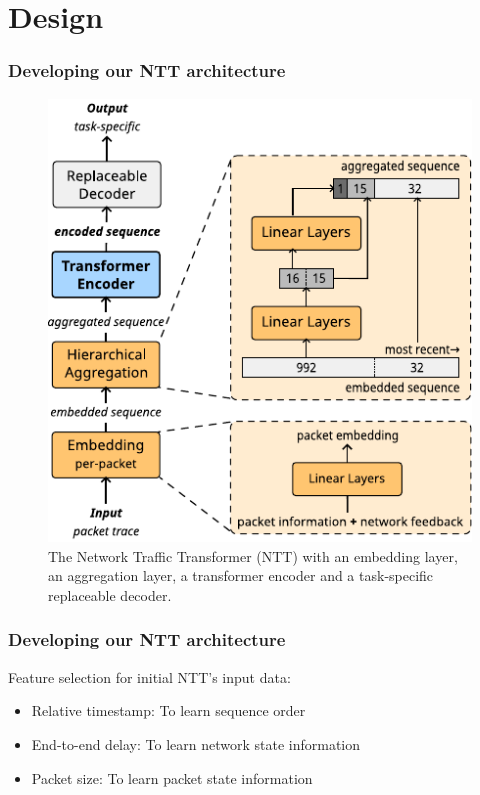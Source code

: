 \documentclass{beamer}
\begin{document}

\section{Design}


\begin{frame}
\frametitle{Developing our NTT architecture}
\pause

\begin{figure}[!hbt]
  \begin{center}
    \includegraphics[scale=0.8]{figures/architecture_ntt.pdf}
    \caption{The Network Traffic Transformer (NTT) with
        an embedding layer, %
        an aggregation layer,  a transformer encoder
        and a task-specific replaceable decoder.}
    \label{fig:ntt}
  \end{center}
\end{figure}
\end{frame}

\begin{frame}
\frametitle{Developing our NTT architecture}

Feature selection for initial NTT's input data:
\pause 
\begin{itemize}
    \item<1-> \alert{Relative timestamp:} To learn sequence order
    \item<1-> \alert{End-to-end delay:} To learn network state information
    \item<1-> \alert{Packet size:} To learn packet state information
\end{itemize}

\end{frame}
\end{document}
